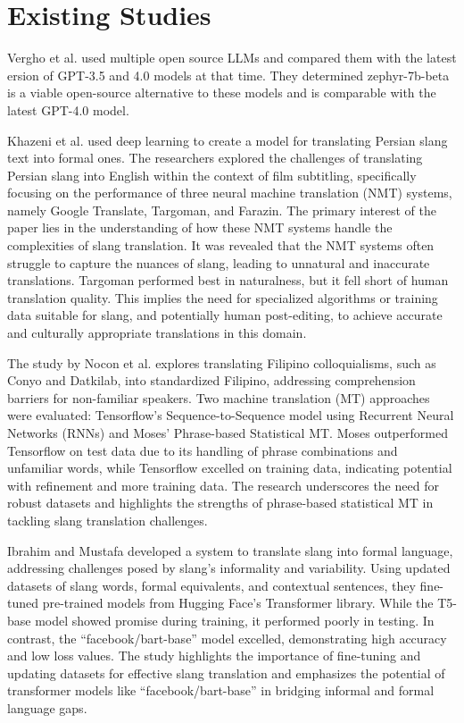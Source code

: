 \section{Existing Studies}
Vergho et al.\cite{vergho2024comparinggpt4opensourcelanguage} used multiple open source LLMs and compared them with the latest ersion of GPT-3.5 and 4.0 models at that time.
They determined zephyr-7b-beta is a viable open-source alternative to these models and is comparable with the latest GPT-4.0 model.

Khazeni et al. \cite{Khazeni} used deep learning to create a model for translating Persian slang text into formal ones. The researchers explored the challenges of translating Persian slang into English within the context of film subtitling, specifically focusing on the performance of three neural machine translation (NMT) systems, namely Google Translate, Targoman, and Farazin. The primary interest of the paper lies in the understanding of how these NMT systems handle the complexities of slang translation. It was revealed that the NMT systems often struggle to capture the nuances of slang, leading to unnatural and inaccurate translations. Targoman performed best in naturalness, but it fell short of human translation quality. This implies the need for specialized algorithms or training data suitable for slang, and potentially human post-editing, to achieve accurate and culturally appropriate translations in this domain.
 
The study by Nocon et al. \cite{Nocon_Kho_Arroyo_2018} explores translating Filipino colloquialisms, such as Conyo and Datkilab, into standardized Filipino, addressing comprehension barriers for non-familiar speakers. Two machine translation (MT) approaches were evaluated: Tensorflow's Sequence-to-Sequence model using Recurrent Neural Networks (RNNs) and Moses' Phrase-based Statistical MT. Moses outperformed Tensorflow on test data due to its handling of phrase combinations and unfamiliar words, while Tensorflow excelled on training data, indicating potential with refinement and more training data. The research underscores the need for robust datasets and highlights the strengths of phrase-based statistical MT in tackling slang translation challenges.

Ibrahim and Mustafa \cite{Abdulstar_Ibrahim_Shareef_Mustafa_2023} developed a system to translate slang into formal language, addressing challenges posed by slang's informality and variability. Using updated datasets of slang words, formal equivalents, and contextual sentences, they fine-tuned pre-trained models from Hugging Face's Transformer library. While the T5-base model showed promise during training, it performed poorly in testing. In contrast, the “facebook/bart-base” model excelled, demonstrating high accuracy and low loss values. The study highlights the importance of fine-tuning and updating datasets for effective slang translation and emphasizes the potential of transformer models like “facebook/bart-base” in bridging informal and formal language gaps. 

